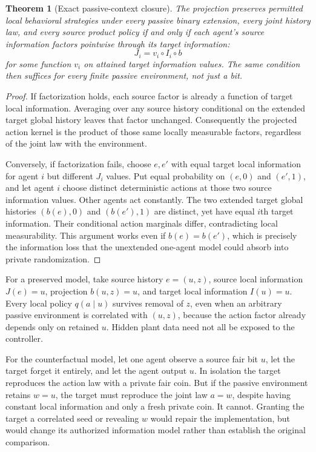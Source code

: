 \documentclass[11pt]{article}
\newtheorem{theorem}{Theorem}\newtheorem{proposition}{Proposition}
\begin{document}
\begin{theorem}[Exact passive-context closure]
The projection preserves permitted local behavioral strategies under every passive binary extension, every joint history law, and every source product policy if and only if each agent's source information factors pointwise through its target information:
\[
 J_i=v_i\circ I_i\circ b
\]
for some function $v_i$ on attained target information values. The same condition then suffices for every finite passive environment, not just a bit.
\end{theorem}
\begin{proof}
If factorization holds, each source factor is already a function of target local information. Averaging over any source history conditional on the extended target global history leaves that factor unchanged. Consequently the projected action kernel is the product of those same locally measurable factors, regardless of the joint law with the environment.

Conversely, if factorization fails, choose $e,e'$ with equal target local information for agent $i$ but different $J_i$ values. Put equal probability on $(e,0)$ and $(e',1)$, and let agent $i$ choose distinct deterministic actions at those two source information values. Other agents act constantly. The two extended target global histories $(b(e),0)$ and $(b(e'),1)$ are distinct, yet have equal $i$th target information. Their conditional action marginals differ, contradicting local measurability. This argument works even if $b(e)=b(e')$, which is precisely the information loss that the unextended one-agent model could absorb into private randomization.
\end{proof}

For a preserved model, take source history $e=(u,z)$, source local information $J(e)=u$, projection $b(u,z)=u$, and target local information $I(u)=u$. Every local policy $q(a\mid u)$ survives removal of $z$, even when an arbitrary passive environment is correlated with $(u,z)$, because the action factor already depends only on retained $u$. Hidden plant data need not all be exposed to the controller.

For the counterfactual model, let one agent observe a source fair bit $u$, let the target forget it entirely, and let the agent output $u$. In isolation the target reproduces the action law with a private fair coin. But if the passive environment retains $w=u$, the target must reproduce the joint law $a=w$, despite having constant local information and only a fresh private coin. It cannot. Granting the target a correlated seed or revealing $w$ would repair the implementation, but would change its authorized information model rather than establish the original comparison.
\end{document}
